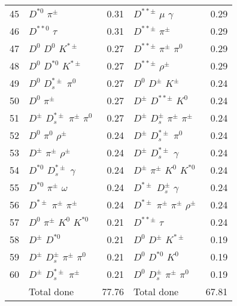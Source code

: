 \documentclass[6pt]{article}
\begin{document}
\begin{tabular}{rlr|lr}
45 & $D^{*0}$ $\pi^{\pm}$ & 0.31 & $D^{**\pm}$ $\mu$ $\gamma$ & 0.29 \\
46 & $D^{**0}$ $\tau$ & 0.31 & $D^{**\pm}$ $\pi^{\pm}$ & 0.29 \\
47 & $D^0$ $D^0$ $K^{*\pm}$ & 0.27 & $D^{**\pm}$ $\pi^{\pm}$ $\pi^0$ & 0.29 \\
48 & $D^0$ $D^{*0}$ $K^{*\pm}$ & 0.27 & $D^{**\pm}$ $\rho^{\pm}$ & 0.29 \\
49 & $D^0$ $D_s^{*\pm}$ $\pi^0$ & 0.27 & $D^0$ $D^{\pm}$ $K^{\pm}$ & 0.24 \\
50 & $D^0$ $\pi^{\pm}$ & 0.27 & $D^{\pm}$ $D^{**\pm}$ $K^0$ & 0.24 \\
51 & $D^{\pm}$ $D_s^{*\pm}$ $\pi^{\pm}$ $\pi^0$ & 0.27 & $D^{\pm}$ $D_s^{\pm}$ $\pi^{\pm}$ $\pi^{\pm}$ & 0.24 \\
52 & $D^0$ $\pi^0$ $\rho^{\pm}$ & 0.24 & $D^{\pm}$ $D_s^{*\pm}$ $\pi^0$ & 0.24 \\
53 & $D^{\pm}$ $\pi^{\pm}$ $\rho^{\pm}$ & 0.24 & $D^{\pm}$ $D_s^{*\pm}$ $\gamma$ & 0.24 \\
54 & $D^{*0}$ $D_s^{*\pm}$ $\gamma$ & 0.24 & $D^{\pm}$ $\pi^{\pm}$ $K^0$ $K^{*0}$ & 0.24 \\
55 & $D^{*0}$ $\pi^{\pm}$ $\omega$ & 0.24 & $D^{*\pm}$ $D_s^{\pm}$ $\gamma$ & 0.24 \\
56 & $D^{*\pm}$ $\pi^{\pm}$ $\pi^{\pm}$ & 0.24 & $D^{*\pm}$ $\pi^{\pm}$ $\pi^{\pm}$ $\rho^{\pm}$ & 0.24 \\
57 & $D^0$ $\pi^{\pm}$ $K^0$ $K^{*0}$ & 0.21 & $D^{**\pm}$ $\tau$ & 0.24 \\
58 & $D^{\pm}$ $D^{*0}$ & 0.21 & $D^0$ $D^{\pm}$ $K^{*\pm}$ & 0.19 \\
59 & $D^{\pm}$ $D_s^{\pm}$ $\pi^{\pm}$ $\pi^0$ & 0.21 & $D^0$ $D^{*0}$ $K^0$ & 0.19 \\
60 & $D^{\pm}$ $D_s^{*\pm}$ $\pi^{\pm}$ & 0.21 & $D^0$ $D_s^{\pm}$ $\pi^{\pm}$ $\pi^0$ & 0.19 \\
\hline & Total done & 77.76 & Total done & 67.81\\
\end{tabular}
\end{document}
